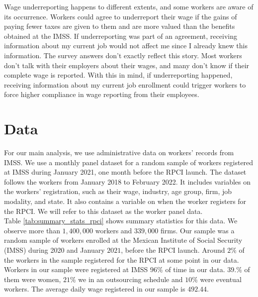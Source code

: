 \documentclass[10pt, oneside]{book}
\begin{document}
Wage underreporting happens to different extents, and some workers are aware of its occurrence. Workers could agree to underreport their wage if the gains of paying fewer taxes are given to them and are more valued than the benefits obtained at the IMSS. If underreporting was part of an agreement, receiving information about my current job would not affect me since I already knew this information. The survey answers don't exactly reflect this story. Most workers don't talk with their employers about their wages, and many don't know if their complete wage is reported. With this in mind, if underreporting happened, receiving information about my current job enrollment could trigger workers to force higher compliance in wage reporting from their employees.

\chapter{Data} \label{data}

For our main analysis, we use administrative data on workers' records from IMSS. We use a monthly panel dataset for a random sample of workers registered at IMSS during January 2021, one month before the RPCI launch. The dataset follows the workers from January 2018 to February 2022. It includes variables on the workers' registration, such as their wage, industry, age group, firm, job modality, and state. It also contains a variable on when the worker registers for the RPCI. We will refer to this dataset as the worker panel data. \\ 

Table \ref{tab:summary_stats_rpci} shows summary statistics for this data. We observe more than $1,400,000$ workers and $339,000$ firms. Our sample was a random sample of workers enrolled at the Mexican Institute of Social Security (IMSS) during 2020 and January $2021$, before the RPCI launch. Around $2\%$ of the workers in the sample registered for the RPCI at some point in our data. Workers in our sample were registered at IMSS $96\%$ of time in our data. $39.\%$ of them were women, $21\%$ we in an outsourcing schedule and $10\%$ were eventual workers. The average daily wage registered in our sample is $492.44$. \\
\end{document}
